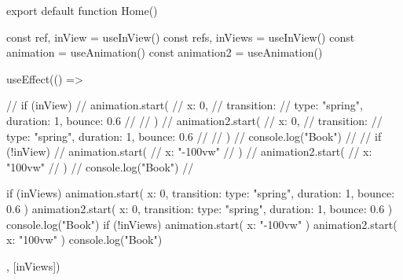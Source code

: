 export default function Home() {

  const { ref, inView } = useInView()
  const { refs, inViews } = useInView()
  const animation = useAnimation()
  const animation2 = useAnimation()

  useEffect(() => {
    // if (inView) {
    //   animation.start({
    //     x: 0,
    //     transition: {
    //       type: "spring", duration: 1, bounce: 0.6
    //     }
    //   })
    //   animation2.start({
    //     x: 0,
    //     transition: {
    //       type: "spring", duration: 1, bounce: 0.6
    //     }
    //   })
    //   console.log("Book")
    // }
    // if (!inView) {
    //   animation.start({
    //     x: "-100vw"
    //   })
    //   animation2.start({
    //     x: "100vw"
    //   })
    //   console.log("Book")
    // }

    if (inViews) {
      animation.start({
        x: 0,
        transition: {
          type: "spring", duration: 1, bounce: 0.6
        }
      })
      animation2.start({
        x: 0,
        transition: {
          type: "spring", duration: 1, bounce: 0.6
        }
      })
      console.log("Book")
    }
    if (!inViews) {
      animation.start({
        x: "-100vw"
      })
      animation2.start({
        x: "100vw"
      })
      console.log("Book")
    }

  }, [inViews])

}
